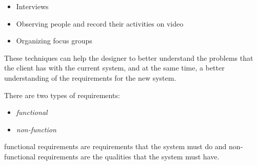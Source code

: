 \begin{itemize}
        \item Interviews
        \item Observing people and record their activities on video
        \item Organizing focus groups
\end{itemize}

These techniques can help the designer to better understand the problems that the client has with the current system, and at the same time, a better understanding of the requirements for the new system.


There are two types of requirements:

\begin{itemize}
        \item \textit{functional}
        \item \textit{non-function}
\end{itemize}

functional requirements are requirements that the system must do and non-functional requirements are the qualities that the system must have.


